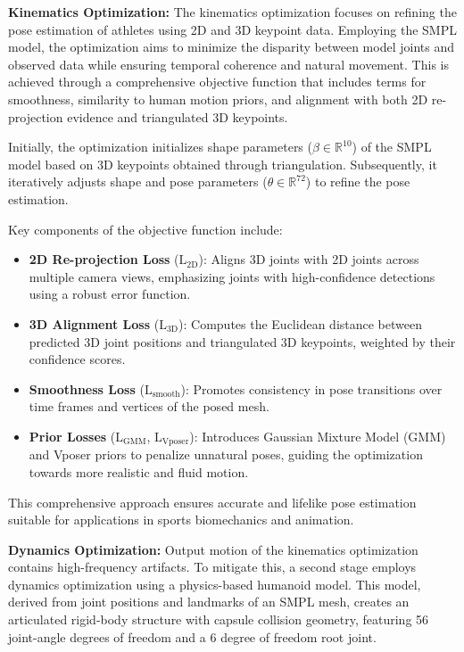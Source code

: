 \documentclass{egpubl}
\begin{document}
\textbf{Kinematics Optimization:} The kinematics optimization focuses on refining the pose estimation of athletes using 2D and 3D keypoint data. Employing the SMPL model, the optimization aims to minimize the disparity between model joints and observed data while ensuring temporal coherence and natural movement. This is achieved through a comprehensive objective function that includes terms for smoothness, similarity to human motion priors, and alignment with both 2D re-projection evidence and triangulated 3D keypoints.

Initially, the optimization initializes shape parameters ($\beta \in \mathbb{R}^{10}$) of the SMPL model based on 3D keypoints obtained through triangulation. Subsequently, it iteratively adjusts shape and pose parameters ($\theta \in \mathbb{R}^{72}$) to refine the pose estimation.

Key components of the objective function include:

\begin{itemize}
    \item \textbf{2D Re-projection Loss} ($\mathrm{L}_\text{2D}$): Aligns 3D joints with 2D joints across multiple camera views, emphasizing joints with high-confidence detections using a robust error function.
    \item \textbf{3D Alignment Loss} ($\mathrm{L}_\text{3D}$): Computes the Euclidean distance between predicted 3D joint positions and triangulated 3D keypoints, weighted by their confidence scores.
    \item \textbf{Smoothness Loss} ($\mathrm{L}_\text{smooth}$): Promotes consistency in pose transitions over time frames and vertices of the posed mesh.
    \item \textbf{Prior Losses} ($\mathrm{L}_{\text{GMM}}$, $\mathrm{L}_{\text{Vposer}}$): Introduces Gaussian Mixture Model (GMM) and Vposer priors to penalize unnatural poses, guiding the optimization towards more realistic and fluid motion.
\end{itemize}
 This comprehensive approach ensures accurate and lifelike pose estimation suitable for applications in sports biomechanics and animation.

\textbf{Dynamics Optimization:} Output motion of the kinematics optimization contains high-frequency artifacts. To mitigate this, a second stage employs dynamics optimization using a physics-based humanoid model. This model, derived from joint positions and landmarks of an SMPL mesh, creates an articulated rigid-body structure with capsule collision geometry, featuring 56 joint-angle degrees of freedom and a 6 degree of freedom root joint.
\end{document}
